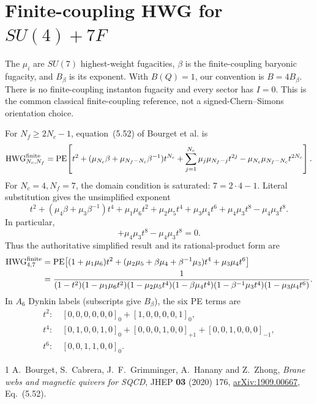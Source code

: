 \documentclass[9pt]{article}
\newcommand{\PE}{\operatorname{PE}}
\newcommand{\HWG}{\operatorname{HWG}}
\begin{document}
\section*{Finite-coupling HWG for $SU(4)+7F$}
The $\mu_i$ are $SU(7)$ highest-weight fugacities, $\beta$ is the
finite-coupling baryonic fugacity, and $B_\beta$ is its exponent.  With
$B(Q)=1$, our convention is $B=4B_\beta$.  There is no finite-coupling
instanton fugacity and every sector has $I=0$.  This is the common classical
finite-coupling reference, not a signed-Chern--Simons orientation choice.

For $N_f\geq2N_c-1$, equation~(5.52) of Bourget et al. is
\[
 \HWG^{\rm finite}_{N_c,N_f}=\PE\!\left[t^2+
 (\mu_{N_c}\beta+\mu_{N_f-N_c}\beta^{-1})t^{N_c}
 +\sum_{j=1}^{N_c}\mu_j\mu_{N_f-j}t^{2j}
 -\mu_{N_c}\mu_{N_f-N_c}t^{2N_c}\right].
\]
For $N_c=4,N_f=7$, the domain condition is saturated: $7=2\cdot4-1$.
Literal substitution gives the unsimplified exponent
\[
t^2+(\mu_4\beta+\mu_3\beta^{-1})t^4+\mu_1\mu_6t^2
+\mu_2\mu_5t^4+\mu_3\mu_4t^6+\mu_4\mu_3t^8
-\mu_4\mu_3t^8.
\]
In particular,
\[+\mu_4\mu_3t^8-\mu_4\mu_3t^8=0.\]
Thus the authoritative simplified result and its rational-product form are
\begin{align*}
\HWG^{\rm finite}_{4,7}
&=\PE\!\left[(1+\mu_1\mu_6)t^2+
(\mu_2\mu_5+\beta\mu_4+\beta^{-1}\mu_3)t^4
+\mu_3\mu_4t^6\right]\\
&=\frac{1}{(1-t^2)(1-\mu_1\mu_6t^2)(1-\mu_2\mu_5t^4)
(1-\beta\mu_4t^4)(1-\beta^{-1}\mu_3t^4)(1-\mu_3\mu_4t^6)}.
\end{align*}
In $A_6$ Dynkin labels (subscripts give $B_\beta$), the six PE terms are
\begin{align*}
t^2:&\ [0,0,0,0,0,0]_0+[1,0,0,0,0,1]_0,\\
t^4:&\ [0,1,0,0,1,0]_0+[0,0,0,1,0,0]_{+1}
       +[0,0,1,0,0,0]_{-1},\\
t^6:&\ [0,0,1,1,0,0]_0.
\end{align*}

\begin{thebibliography}{1}
 A.~Bourget, S.~Cabrera, J.~F.~Grimminger,
A.~Hanany and Z.~Zhong, \emph{Brane webs and magnetic quivers for SQCD},
JHEP \textbf{03} (2020) 176,
\href{https://arxiv.org/abs/1909.00667}{arXiv:1909.00667}, Eq.~(5.52).
\end{thebibliography}
\end{document}
